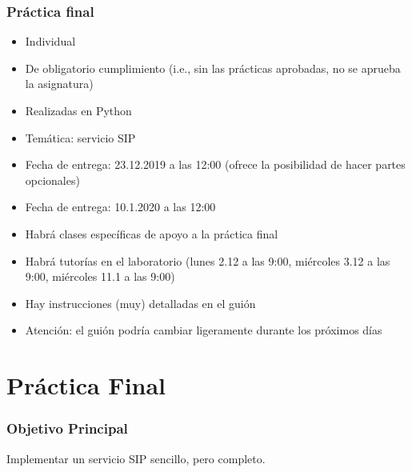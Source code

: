 \documentclass{beamer}
\begin{document}
\begin{frame}
\frametitle{Práctica final}

\begin{itemize}
  \item Individual
  \item De obligatorio cumplimiento (i.e., sin las prácticas aprobadas, no se aprueba la asignatura)
  \item Realizadas en Python
  \item Temática: servicio SIP
  \item Fecha de entrega: 23.12.2019 a las 12:00 (ofrece la posibilidad de hacer partes opcionales)
  \item Fecha de entrega: 10.1.2020 a las 12:00
  \item Habrá clases específicas de apoyo a la práctica final
  \item Habrá tutorías en el laboratorio (lunes 2.12 a las 9:00, miércoles 3.12 a las 9:00, miércoles 11.1 a las 9:00)
  \item Hay instrucciones (muy) detalladas en el guión
  \item Atención: el guión podría cambiar ligeramente durante los próximos días
\end{itemize}

\end{frame}


\section{Práctica Final}

\begin{frame}
\frametitle{Objetivo Principal}

\begin{center}
  \begin{huge}
    Implementar un servicio SIP sencillo, pero completo.
  \end{huge}
\end{center}

\end{frame}

\end{document}
